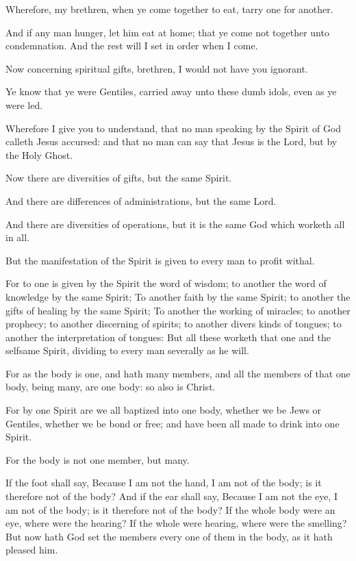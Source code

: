 \Verse Wherefore, my brethren, when ye come together to eat, tarry one for another.

\Verse And if any man hunger, let him eat at home; that ye come not together unto condemnation. And the rest will I set in order when I come.


\Chapter
\Verse Now concerning spiritual gifts, brethren, I would not have you ignorant.

\Verse Ye know that ye were Gentiles, carried away unto these dumb idols, even as ye were led.

\Verse Wherefore I give you to understand, that no man speaking by the Spirit of God calleth Jesus accursed: and that no man can say that Jesus is the Lord, but by the Holy Ghost.

\Verse Now there are diversities of gifts, but the same Spirit.

\Verse And there are differences of administrations, but the same Lord.

\Verse And there are diversities of operations, but it is the same God which worketh all in all.

\Verse But the manifestation of the Spirit is given to every man to profit withal.

\Verse For to one is given by the Spirit the word of wisdom; to another the word of knowledge by the same Spirit; \Verse To another faith by the same Spirit; to another the gifts of healing by the same Spirit; \Verse To another the working of miracles; to another prophecy; to another discerning of spirits; to another divers kinds of tongues; to another the interpretation of tongues: \Verse But all these worketh that one and the selfsame Spirit, dividing to every man severally as he will.

\Verse For as the body is one, and hath many members, and all the members of that one body, being many, are one body: so also is Christ.

\Verse For by one Spirit are we all baptized into one body, whether we be Jews or Gentiles, whether we be bond or free; and have been all made to drink into one Spirit.

\Verse For the body is not one member, but many.

\Verse If the foot shall say, Because I am not the hand, I am not of the body; is it therefore not of the body?  \Verse And if the ear shall say, Because I am not the eye, I am not of the body; is it therefore not of the body?  \Verse If the whole body were an eye, where were the hearing? If the whole were hearing, where were the smelling?  \Verse But now hath God set the members every one of them in the body, as it hath pleased him.

